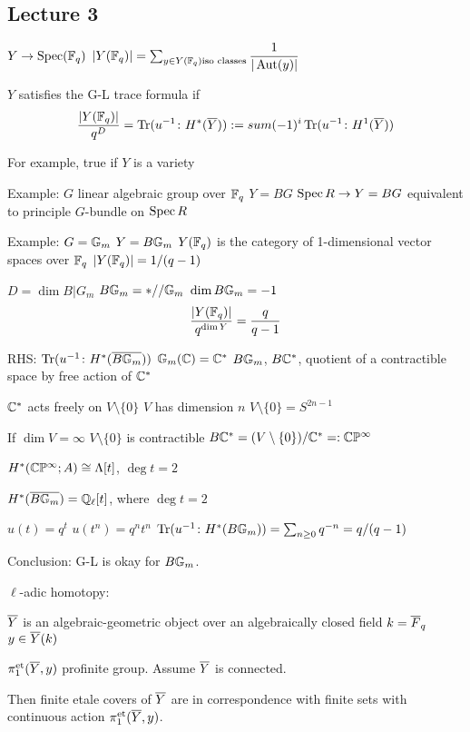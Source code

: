 \newpage
\subsection{Lecture 3}

$Y \to \operatorname{Spec}(\mathbb{F}_q)$
$|Y(\mathbb{F}_q)|= \sum_{y \in Y(\mathbb{F}_q) \text{iso classes}} \dfrac{1}{|\operatorname{Aut}(y)|}$

\begin{dfn}
$Y$ satisfies the G-L trace formula if
	\[
	\dfrac{|Y(\mathbb{F}_q)|}{q^D}= \operatorname{Tr}(u^{-1} \colon H^*(\overline{Y})):=sum (-1)^i \operatorname{Tr}(u^{-1} \colon H^1(\overline{Y}))
	\]
\end{dfn}

For example, true if $Y$ is a variety


Example: $G$ linear algebraic group over $\mathbb{F}_q$
$Y= BG$
$\operatorname{Spec} R \to Y= BG$ equivalent to principle $G$-bundle on $\operatorname{Spec} R$



Example: $G= \mathbb{G}_m$
$Y= B\mathbb{G}_m$
$Y(\mathbb{F}_q)$ is the category of 1-dimensional vector spaces over $\mathbb{F}_q$
$|Y(\mathbb{F}_q)|= 1/(q-1)$

$D= \dim B|G_m$
$B\mathbb{G}_m= *//\mathbb{G}_m$
$\dim B\mathbb{G}_m= -1$
	\[
	\dfrac{|Y(\mathbb{F}_q)|}{q^{\dim Y}}= \dfrac{q}{q-1}
	\]

RHS: $\operatorname{Tr}(u^{-1} \colon H^*(\overline{B\mathbb{G}_m}))$
$\mathbb{G}_m(\mathbb{C})=\mathbb{C}^*$
$B\mathbb{G}_m$, $B\mathbb{C}^*$, quotient of a contractible space by free action of $\mathbb{C}^*$

$\mathbb{C}^*$ acts freely on $V \setminus \{0\}$
$V$ has dimension $n$
$V \setminus \{0\}= S^{2n-1}$

If $\dim V= \infty$
$V \setminus \{0\}$ is contractible
$B\mathbb{C}^*= (V \setminus \{0\})/\mathbb{C}^* =: \mathbb{C}\mathbb{P}^\infty$

$H^*(\mathbb{C}\mathbb{P}^\infty; A) \cong \Lambda[t]$, $\deg t= 2$

$H^*(\overline{B\mathbb{G}_m})= \mathbb{Q}_\ell[t]$, where $\deg t= 2$

$u(t)= q^t$
$u(t^n)= q^nt^n$
$\operatorname{Tr}(u^{-1} \colon H^*(B\mathbb{G}_m))= \sum_{n \geq 0} q^{-n}= q/(q-1)$

Conclusion: G-L is okay for $B\mathbb{G}_m$.


$\ell$-adic homotopy:

$\overline{Y}$ is an algebraic-geometric object over an algebraically closed field $k= \overline{F}_q$
$y \in \overline{Y}(k)$ 

$\pi_1^{\text{et}}(\overline{Y},y)$ profinite group. Assume $\overline{Y}$ is connected.

Then finite etale covers of $\overline{Y}$ are in correspondence with finite sets with continuous action $\pi_1^\text{et}(\overline{Y},y)$.

